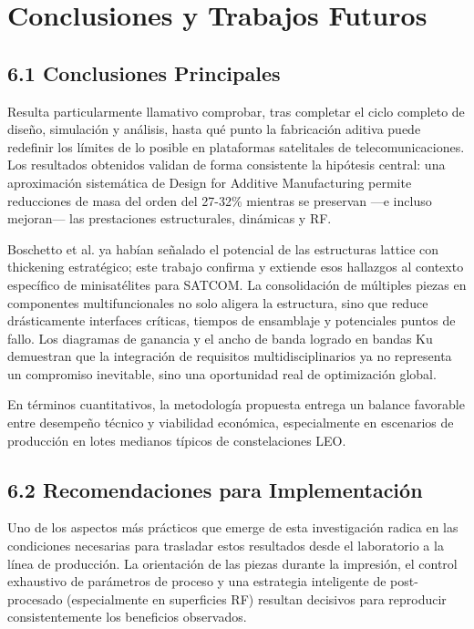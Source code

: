 \section{Conclusiones y Trabajos Futuros}

\subsection{6.1 Conclusiones Principales}

Resulta particularmente llamativo comprobar, tras completar el ciclo completo de diseño, simulación y análisis, hasta qué punto la fabricación aditiva puede redefinir los límites de lo posible en plataformas satelitales de telecomunicaciones. Los resultados obtenidos validan de forma consistente la hipótesis central: una aproximación sistemática de Design for Additive Manufacturing permite reducciones de masa del orden del 27-32\% mientras se preservan —e incluso mejoran— las prestaciones estructurales, dinámicas y RF.

Boschetto et al. \cite{Boschetto2023} ya habían señalado el potencial de las estructuras lattice con thickening estratégico; este trabajo confirma y extiende esos hallazgos al contexto específico de minisatélites para SATCOM. La consolidación de múltiples piezas en componentes multifuncionales no solo aligera la estructura, sino que reduce drásticamente interfaces críticas, tiempos de ensamblaje y potenciales puntos de fallo. Los diagramas de ganancia y el ancho de banda logrado en bandas Ku demuestran que la integración de requisitos multidisciplinarios ya no representa un compromiso inevitable, sino una oportunidad real de optimización global.

En términos cuantitativos, la metodología propuesta entrega un balance favorable entre desempeño técnico y viabilidad económica, especialmente en escenarios de producción en lotes medianos típicos de constelaciones LEO.

\subsection{6.2 Recomendaciones para Implementación}

Uno de los aspectos más prácticos que emerge de esta investigación radica en las condiciones necesarias para trasladar estos resultados desde el laboratorio a la línea de producción. La orientación de las piezas durante la impresión, el control exhaustivo de parámetros de proceso y una estrategia inteligente de post-procesado (especialmente en superficies RF) resultan decisivos para reproducir consistentemente los beneficios observados.

